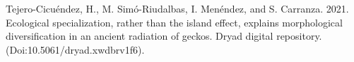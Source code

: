 \documentclass[
  11pt,
]{article}
\newlength{\cslhangindent}
\newlength{\cslentryspacingunit} %
\newenvironment{CSLReferences}[2] %
 {%
  \setlength{\parindent}{0pt}
  \ifodd #1
  \let\oldpar\par
  \def\par{\hangindent=\cslhangindent\oldpar}
  \fi
  \setlength{\parskip}{#2\cslentryspacingunit}
 }%
 {}
\begin{document}
\setlength{\parindent}{-0.25in} \setlength{\leftskip}{0.25in}
\setlength{\parskip}{8pt} \noindent

\hypertarget{refs}{}
\begin{CSLReferences}{1}{0}
\leavevmode{}%
Tejero-Cicuéndez, H., M. Simó-Riudalbas, I. Menéndez, and S. Carranza.
2021. Ecological specialization, rather than the island effect, explains
morphological diversification in an ancient radiation of geckos. Dryad
digital repository. (Doi:10.5061/dryad.xwdbrv1f6).

\end{CSLReferences}

\newpage
\end{document}
